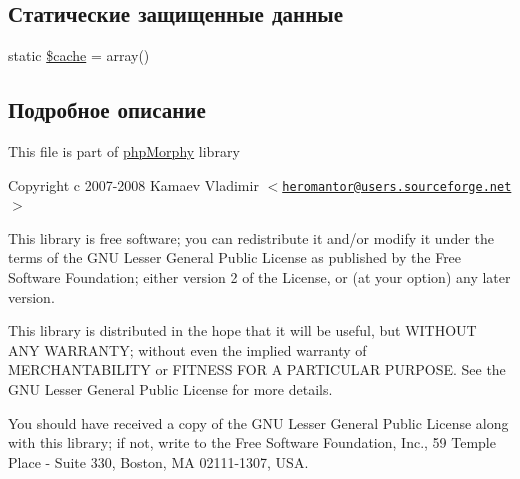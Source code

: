 \subsection*{Статические защищенные данные}
\begin{DoxyCompactItemize}
\item 
static \hyperlink{classphpMorphy__UnicodeHelper_aef395c109d8ab5539e79f5fbb90268fc}{\$cache} = array()
\end{DoxyCompactItemize}


\subsection{Подробное описание}
This file is part of \hyperlink{classphpMorphy}{phpMorphy} library

Copyright c 2007-\/2008 Kamaev Vladimir $<$\href{mailto:heromantor@users.sourceforge.net}{\tt heromantor@users.sourceforge.net}$>$

This library is free software; you can redistribute it and/or modify it under the terms of the GNU Lesser General Public License as published by the Free Software Foundation; either version 2 of the License, or (at your option) any later version.

This library is distributed in the hope that it will be useful, but WITHOUT ANY WARRANTY; without even the implied warranty of MERCHANTABILITY or FITNESS FOR A PARTICULAR PURPOSE. See the GNU Lesser General Public License for more details.

You should have received a copy of the GNU Lesser General Public License along with this library; if not, write to the Free Software Foundation, Inc., 59 Temple Place -\/ Suite 330, Boston, MA 02111-\/1307, USA. 


